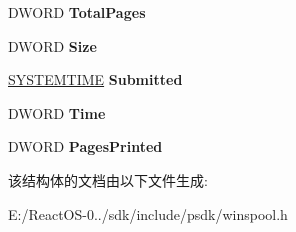 \begin{DoxyCompactItemize}
\mbox{\label{struct___j_o_b___i_n_f_o__2_w_aeeab08f316b542d0102b25c05b411301}} 
D\+W\+O\+RD {\bfseries Total\+Pages}
\item 
\mbox{\label{struct___j_o_b___i_n_f_o__2_w_ae260f3361281df23812edddb639ea6eb}} 
D\+W\+O\+RD {\bfseries Size}
\item 
\mbox{\label{struct___j_o_b___i_n_f_o__2_w_ad67b1add8d7c7c79c810e7484e5c5602}} 
\hyperlink{struct___s_y_s_t_e_m_t_i_m_e}{S\+Y\+S\+T\+E\+M\+T\+I\+ME} {\bfseries Submitted}
\item 
\mbox{\label{struct___j_o_b___i_n_f_o__2_w_a6568a7e447fbb452b23b5a41a21e76cc}} 
D\+W\+O\+RD {\bfseries Time}
\item 
\mbox{\label{struct___j_o_b___i_n_f_o__2_w_ac5870f1219cad521e333793034694ded}} 
D\+W\+O\+RD {\bfseries Pages\+Printed}
\end{DoxyCompactItemize}


该结构体的文档由以下文件生成\+:\begin{DoxyCompactItemize}
\item 
E\+:/\+React\+O\+S-\/0../sdk/include/psdk/winspool.\+h\end{DoxyCompactItemize}
